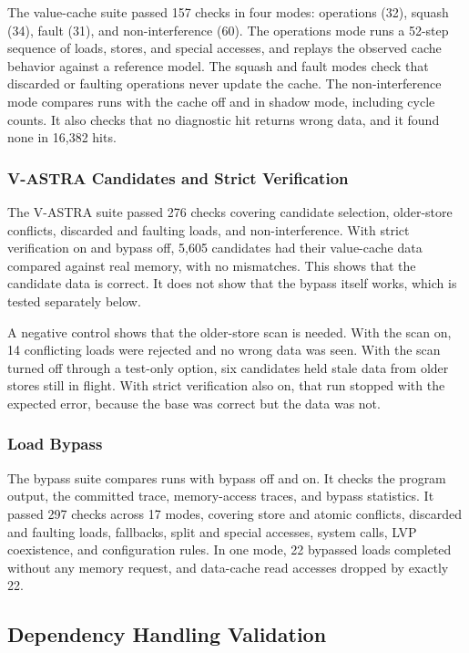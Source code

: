 The value-cache suite passed 157 checks in four modes: operations
(32), squash (34), fault (31), and non-interference (60). The
operations mode runs a 52-step sequence of loads, stores, and special
accesses, and replays the observed cache behavior against a reference
model. The squash and fault modes check that discarded or faulting
operations never update the cache. The non-interference mode compares
runs with the cache off and in shadow mode, including cycle counts.
It also checks that no diagnostic hit returns wrong data, and it found
none in 16,382 hits.

\subsubsection{V-ASTRA Candidates and Strict Verification}
\label{subsubsec:vastra-candidate-validation}

The V-ASTRA suite passed 276 checks covering candidate selection,
older-store conflicts, discarded and faulting loads, and
non-interference. With strict verification on and bypass off, 5,605
candidates had their value-cache data compared against real memory,
with no mismatches. This shows that the candidate data is correct. It
does not show that the bypass itself works, which is tested
separately below.

A negative control shows that the older-store scan is needed. With the
scan on, 14 conflicting loads were rejected and no wrong data was
seen. With the scan turned off through a test-only option, six
candidates held stale data from older stores still in flight. With
strict verification also on, that run stopped with the expected error,
because the base was correct but the data was not.

\subsubsection{Load Bypass}
\label{subsubsec:vastra-bypass-validation}

The bypass suite compares runs with bypass off and on. It checks the
program output, the committed trace, memory-access traces, and bypass
statistics. It passed 297 checks across 17 modes, covering store and
atomic conflicts, discarded and faulting loads, fallbacks, split and
special accesses, system calls, LVP coexistence, and configuration
rules. In one mode, 22 bypassed loads completed without any memory
request, and data-cache read accesses dropped by exactly 22.

\subsection{Dependency Handling Validation}
\label{subsec:dependency-handling-validation}

